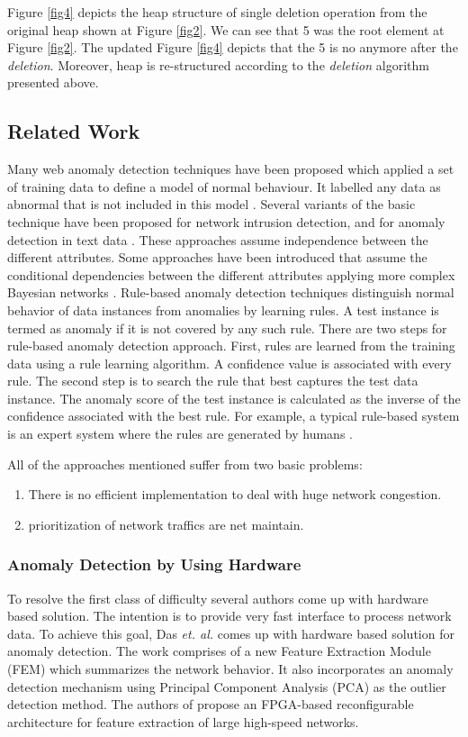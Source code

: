 \documentclass[10pt, conference, compsocconf]{IEEEtran}
\begin{document}
Figure \ref{fig4} depicts the heap structure of single deletion operation from the original heap shown at Figure \ref{fig2}. We can see that 5 was the root element at Figure \ref{fig2}. The updated Figure \ref{fig4} depicts that the 5 is no anymore after the {\it deletion}. Moreover, heap is re-structured according to the {\it deletion} algorithm presented above.


\subsection{Related Work}
Many web anomaly detection techniques have been proposed which applied a set of training data to define a model of normal behaviour. It labelled any data as abnormal that is not included in this model \cite{35,62,160,198,Chr,Fre,Kon}. Several variants of the basic technique have been proposed for network intrusion detection, and for anomaly detection in text data \cite{Moh,Meh,gio}. These approaches assume independence between the different attributes. Some approaches have been introduced that assume the conditional dependencies between the different attributes applying more complex Bayesian networks \cite{Janakiram,Das,Wil}. Rule-based anomaly detection techniques distinguish normal behavior of data instances from anomalies by learning rules. A test instance is termed as anomaly if it is not covered by any such rule. There are two steps for rule-based anomaly detection approach. First, rules are learned from the training data using a rule learning algorithm. A confidence value is associated with every rule. The second step is to search the rule that best captures the test data instance. The anomaly score of the test instance is calculated as the inverse of the confidence associated with the best rule. For example, a typical rule-based system is an expert system where the rules are generated by humans \cite {1,68,111}.

All of the approaches mentioned suffer from two basic problems:
\begin{enumerate}
\item There is no efficient implementation to deal with huge network congestion.
\item prioritization of network traffics are net maintain.
\end{enumerate}

\subsubsection{Anomaly Detection by Using Hardware}
To resolve the first class of difficulty several authors \cite{ah1,ah3} come up with hardware based solution. The intention is to provide very fast interface to process network data. To achieve this goal, Das {\it et. al.} \cite{ah1,ah2} comes up with hardware based solution for anomaly detection. The work comprises of a new Feature Extraction Module (FEM) which summarizes the network behavior. It also incorporates an anomaly detection mechanism using Principal Component Analysis (PCA) as the outlier detection method. The authors of \cite{ah3} propose an FPGA-based reconfigurable architecture for feature extraction of large high-speed networks.
\end{document}
